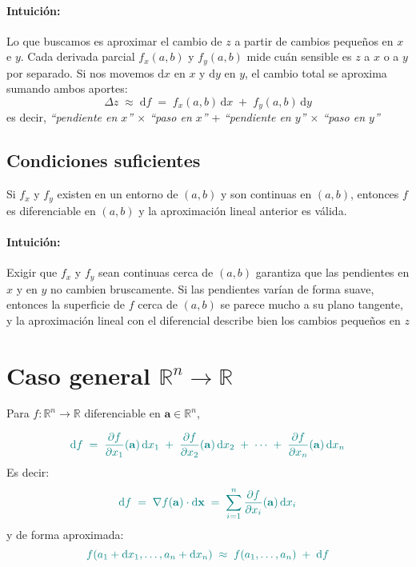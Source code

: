 \documentclass{article}
\begin{document}
\paragraph*{Intuición:}
Lo que buscamos es aproximar el cambio de \(z\) a partir de cambios pequeños en \(x\) e \(y\).
Cada derivada parcial \(f_x(a,b)\) y \(f_y(a,b)\) mide cuán sensible es \(z\) a \(x\) o a \(y\) por separado.
Si nos movemos \(\mathrm{d}x\) en \(x\) y \(\mathrm{d}y\) en \(y\), el cambio total se aproxima sumando ambos aportes:
\[
\Delta z \;\approx\; \mathrm{d}f \;=\; f_x(a,b)\,\mathrm{d}x \;+\; f_y(a,b)\,\mathrm{d}y
\]
es decir, \emph{\color{teal}“pendiente en \(x\)” \(\times\) “paso en \(x\)”} + \emph{\color{teal}“pendiente en \(y\)” \(\times\) “paso en \(y\)”}



\subsection*{Condiciones suficientes}
Si \(f_x\) y \(f_y\) existen en un entorno de \((a,b)\) y son continuas en \((a,b)\), entonces \(f\) es diferenciable en \((a,b)\) y la aproximación lineal anterior es válida.

\paragraph*{Intuición:}
Exigir que \(f_x\) y \(f_y\) sean continuas cerca de \((a,b)\) garantiza que las pendientes en \(x\) y en \(y\) no cambien bruscamente.
Si las pendientes varían de forma suave, entonces la superficie de \(f\) cerca de \((a,b)\) se parece mucho a su plano tangente, y la aproximación lineal con el diferencial describe bien los cambios pequeños en \(z\)


\section*{Caso general \(\mathbb{R}^n\to\mathbb{R}\)}
Para \(f:\mathbb{R}^n\to\mathbb{R}\) diferenciable en \(\mathbf{a}\in\mathbb{R}^n\),


\[
\color{teal}
\mathrm{d}f
\;=\;
\frac{\partial f}{\partial x_1}(\mathbf{a})\,\mathrm{d}x_1
\;+\;
\frac{\partial f}{\partial x_2}(\mathbf{a})\,\mathrm{d}x_2
\;+\;
\cdots
\;+\;
\frac{\partial f}{\partial x_n}(\mathbf{a})\,\mathrm{d}x_n
\]
Es decir:
\[
\color{teal}
\mathrm{d}f \;=\; \nabla f(\mathbf{a})\cdot \mathrm{d}\mathbf{x}
\;=\; \sum_{i=1}^{n} \frac{\partial f}{\partial x_i}(\mathbf{a})\,\mathrm{d}x_i
\]
y de forma aproximada:
\[
\color{teal}
f(a_1+\mathrm{d}x_1,\dots,a_n+\mathrm{d}x_n)
\;\approx\;
f(a_1,\dots,a_n) \;+\; \mathrm{d}f
\]
\end{document}
